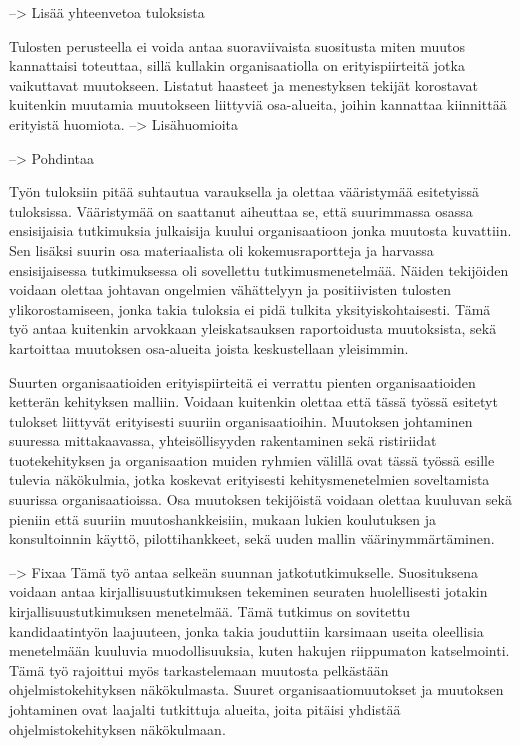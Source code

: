 --> Lisää yhteenvetoa tuloksista

Tulosten perusteella ei voida antaa suoraviivaista suositusta miten muutos
kannattaisi toteuttaa, sillä kullakin organisaatiolla on erityispiirteitä jotka
vaikuttavat muutokseen. Listatut haasteet ja menestyksen tekijät korostavat
kuitenkin muutamia muutokseen liittyviä osa-alueita, joihin kannattaa kiinnittää
erityistä huomiota.
--> Lisähuomioita

--> Pohdintaa

Työn tuloksiin pitää suhtautua varauksella ja olettaa vääristymää esitetyissä
tuloksissa. Vääristymää on saattanut aiheuttaa se, että suurimmassa osassa
ensisijaisia tutkimuksia julkaisija kuului organisaatioon jonka muutosta
kuvattiin. Sen lisäksi suurin osa materiaalista oli kokemusraportteja ja
harvassa ensisijaisessa tutkimuksessa oli sovellettu tutkimusmenetelmää. Näiden
tekijöiden voidaan olettaa johtavan ongelmien vähättelyyn ja positiivisten
tulosten ylikorostamiseen, jonka takia tuloksia ei pidä tulkita
yksityiskohtaisesti. Tämä työ antaa kuitenkin arvokkaan yleiskatsauksen
raportoidusta muutoksista, sekä kartoittaa muutoksen osa-alueita joista
keskustellaan yleisimmin.

Suurten organisaatioiden erityispiirteitä ei verrattu pienten organisaatioiden
ketterän kehityksen malliin. Voidaan kuitenkin olettaa että tässä työssä
esitetyt tulokset liittyvät erityisesti suuriin organisaatioihin. Muutoksen
johtaminen suuressa mittakaavassa, yhteisöllisyyden rakentaminen sekä
ristiriidat tuotekehityksen ja organisaation muiden ryhmien välillä ovat tässä
työssä esille tulevia näkökulmia, jotka koskevat erityisesti kehitysmenetelmien
soveltamista suurissa organisaatioissa. Osa muutoksen tekijöistä voidaan olettaa
kuuluvan sekä pieniin että suuriin muutoshankkeisiin, mukaan lukien koulutuksen
ja konsultoinnin käyttö, pilottihankkeet, sekä uuden mallin väärinymmärtäminen.

--> Fixaa
Tämä työ antaa selkeän suunnan jatkotutkimukselle. Suosituksena voidaan antaa
kirjallisuustutkimuksen tekeminen seuraten huolellisesti jotakin
kirjallisuustutkimuksen menetelmää. Tämä tutkimus on sovitettu kandidaatintyön
laajuuteen, jonka takia jouduttiin karsimaan useita oleellisia menetelmään
kuuluvia muodollisuuksia, kuten hakujen riippumaton katselmointi. Tämä työ
rajoittui myös tarkastelemaan muutosta pelkästään ohjelmistokehityksen
näkökulmasta. Suuret organisaatiomuutokset ja muutoksen johtaminen ovat laajalti
tutkittuja alueita, joita pitäisi yhdistää ohjelmistokehityksen näkökulmaan.




